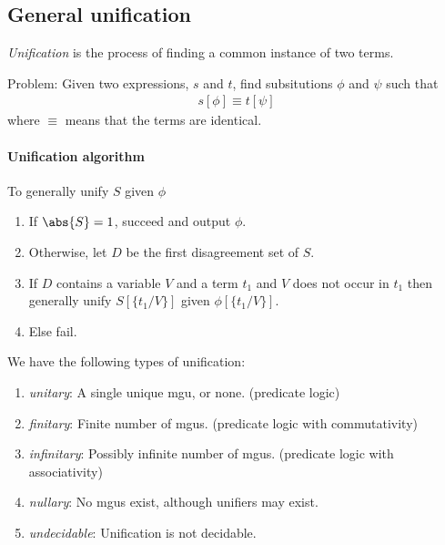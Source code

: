 \documentclass{article}
\begin{document}
\subsection{General unification}

\begin{definition}
	\emph{Unification} is the process of finding a common instance of two terms.

	Problem: Given two expressions, $s$ and $t$, find subsitutions
	$\phi$ and $\psi$ such that
	\begin{align*}
		s[\phi] \equiv t[\psi]
	\end{align*}
	where $\equiv$ means that the terms are identical.
\end{definition}

\paragraph{Unification algorithm}

To generally unify $S$ given $\phi$
\begin{enumerate}
	\item If $\abs{S}=1$, succeed and output $\phi$.
	\item Otherwise, let $D$ be the first disagreement set of $S$.
	\item If $D$ contains a variable $V$ and a term $t_1$ and $V$
	      does not occur in $t_1$ then generally unify $S[\{t_1/V\}]$ given $\phi[\{t_1/V\}]$.
	\item Else fail.
\end{enumerate}

\begin{definition}
	We have the following types of unification:
	\begin{enumerate}
		\item \emph{unitary}: A single unique mgu, or none. (predicate logic)
		\item \emph{finitary}: Finite number of mgus. (predicate logic with commutativity)
		\item \emph{infinitary}: Possibly infinite number of mgus. (predicate logic with associativity)
		\item \emph{nullary}: No mgus exist, although unifiers may exist.
		\item \emph{undecidable}: Unification is not decidable.
	\end{enumerate}
\end{definition}
\end{document}
